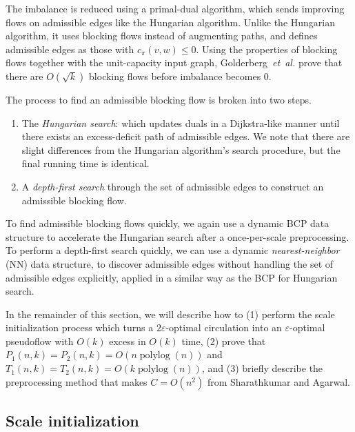 \documentclass[11pt]{article}
\def\etal{\textsl{et~al.}}
\def\polylog{\mathop{\mathrm{polylog}}}
\def\eps{\varepsilon}
\theoremstyle{plain}
\begin{document}
The imbalance is reduced using a primal-dual algorithm, which sends 
improving flows on admissible edges like the Hungarian algorithm.
Unlike the Hungarian algorithm, it uses blocking flows instead of augmenting 
paths, and defines admissible edges as those with $c_\pi(v, w) \leq 0$.
Using the properties of blocking flows together with the unit-capacity input 
graph, Golderberg~{\etal} prove that there are $O(\sqrt{k})$ blocking flows 
before imbalance becomes 0.


The process to find an admissible blocking flow is broken into two steps.
\begin{enumerate}
\item The \emph{Hungarian search}: which updates duals in a Dijkstra-like 
	manner until there exists an excess-deficit path of admissible edges.
	We note that there are slight differences from the Hungarian 
	algorithm's search procedure, but the final running time is identical.
\item A \emph{depth-first search} through the set of admissible edges to
	construct an admissible blocking flow.
\end{enumerate}
To find admissible blocking flows quickly, we again use a dynamic BCP data 
structure to accelerate the Hungarian search after a once-per-scale 
preprocessing.
To perform a depth-first search quickly, we can use a dynamic 
\emph{nearest-neighbor} (NN) data structure, to discover admissible edges 
without handling the set of admissible edges explicitly, applied in a similar 
way as the BCP for Hungarian search.


In the remainder of this section, we will describe how to (1) perform the scale
initialization process which turns a $2\eps$-optimal circulation into an 
$\eps$-optimal pseudoflow with $O(k)$ excess in $O(k)$ time, (2) prove that 
$P_1(n, k) = P_2(n, k) = O(n\polylog(n))$ and 
$T_1(n, k) = T_2(n, k) = O(k\polylog(n))$, and (3) briefly describe the 
preprocessing method that makes $C = O(n^2)$ from Sharathkumar and Agarwal.





\subsection{Scale initialization}
\end{document}
